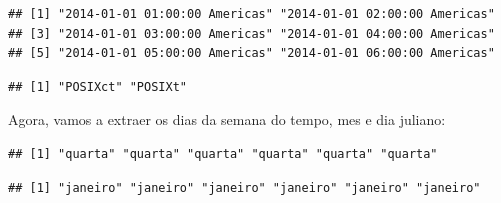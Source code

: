 \documentclass[]{book}
\newenvironment{Shaded}{\begin{snugshade}}{\end{snugshade}}
\newcommand{\KeywordTok}[1]{\textcolor[rgb]{0.13,0.29,0.53}{\textbf{#1}}}
\newcommand{\StringTok}[1]{\textcolor[rgb]{0.31,0.60,0.02}{#1}}
\newcommand{\OperatorTok}[1]{\textcolor[rgb]{0.81,0.36,0.00}{\textbf{#1}}}
\newcommand{\NormalTok}[1]{#1}
\theoremstyle{definition}
\theoremstyle{definition}
\theoremstyle{definition}
\theoremstyle{remark}
\begin{document}
\begin{verbatim}
## [1] "2014-01-01 01:00:00 Americas" "2014-01-01 02:00:00 Americas"
## [3] "2014-01-01 03:00:00 Americas" "2014-01-01 04:00:00 Americas"
## [5] "2014-01-01 05:00:00 Americas" "2014-01-01 06:00:00 Americas"
\end{verbatim}

\begin{Shaded}
\end{Shaded}

\begin{verbatim}
## [1] "POSIXct" "POSIXt"
\end{verbatim}

Agora, vamos a extraer os dias da semana do tempo, mes e dia juliano:

\begin{Shaded}
\end{Shaded}

\begin{verbatim}
## [1] "quarta" "quarta" "quarta" "quarta" "quarta" "quarta"
\end{verbatim}

\begin{Shaded}
\end{Shaded}

\begin{verbatim}
## [1] "janeiro" "janeiro" "janeiro" "janeiro" "janeiro" "janeiro"
\end{verbatim}

\begin{Shaded}
\end{Shaded}
\end{document}
